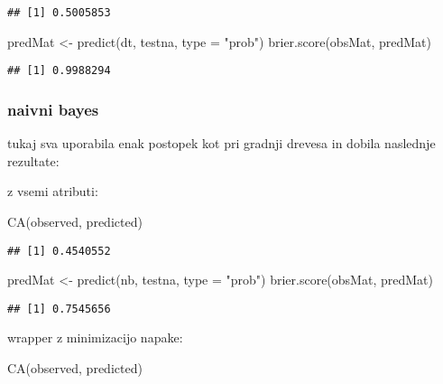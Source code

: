 \documentclass[
]{article}
\newenvironment{Shaded}{\begin{snugshade}}{\end{snugshade}}
\newcommand{\AttributeTok}[1]{\textcolor[rgb]{0.77,0.63,0.00}{#1}}
\newcommand{\FunctionTok}[1]{\textcolor[rgb]{0.00,0.00,0.00}{#1}}
\newcommand{\NormalTok}[1]{#1}
\newcommand{\OtherTok}[1]{\textcolor[rgb]{0.56,0.35,0.01}{#1}}
\newcommand{\StringTok}[1]{\textcolor[rgb]{0.31,0.60,0.02}{#1}}
\begin{document}
\begin{verbatim}
## [1] 0.5005853
\end{verbatim}

\begin{Shaded}
\begin{Highlighting}[]
\NormalTok{predMat }\OtherTok{\textless{}{-}} \FunctionTok{predict}\NormalTok{(dt, testna, }\AttributeTok{type =} \StringTok{"prob"}\NormalTok{)}
\FunctionTok{brier.score}\NormalTok{(obsMat, predMat)}
\end{Highlighting}
\end{Shaded}

\begin{verbatim}
## [1] 0.9988294
\end{verbatim}

\hypertarget{naivni-bayes}{%
\subsubsection{naivni bayes}\label{naivni-bayes}}

tukaj sva uporabila enak postopek kot pri gradnji drevesa in dobila
naslednje rezultate:

z vsemi atributi:

\begin{Shaded}
\begin{Highlighting}[]
\FunctionTok{CA}\NormalTok{(observed, predicted)}
\end{Highlighting}
\end{Shaded}

\begin{verbatim}
## [1] 0.4540552
\end{verbatim}

\begin{Shaded}
\begin{Highlighting}[]
\NormalTok{predMat }\OtherTok{\textless{}{-}} \FunctionTok{predict}\NormalTok{(nb, testna, }\AttributeTok{type =} \StringTok{"prob"}\NormalTok{)}
\FunctionTok{brier.score}\NormalTok{(obsMat, predMat)}
\end{Highlighting}
\end{Shaded}

\begin{verbatim}
## [1] 0.7545656
\end{verbatim}

wrapper z minimizacijo napake:

\begin{Shaded}
\begin{Highlighting}[]
\FunctionTok{CA}\NormalTok{(observed, predicted)}
\end{Highlighting}
\end{Shaded}
\end{document}
